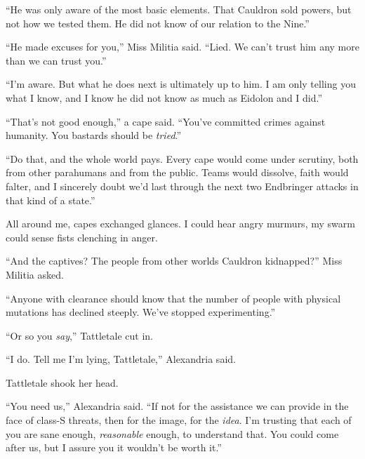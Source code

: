 ``He was only aware of the most basic elements.  That Cauldron sold powers, but not how we tested them.  He did not know of our relation to the Nine.''



``He made excuses for you,'' Miss Militia said.  ``Lied.  We can't trust him any more than we can trust you.''



``I'm aware.  But what he does next is ultimately up to him.  I am only telling you what I know, and I know he did not know as much as Eidolon and I did.''



``That's not good enough,'' a cape said.  ``You've committed crimes against humanity.  You bastards should be \emph{tried}.''



``Do that, and the whole world pays.  Every cape would come under scrutiny, both from other parahumans and from the public.  Teams would dissolve, faith would falter, and I sincerely doubt we'd last through the next two Endbringer attacks in that kind of a state.''



All around me, capes exchanged glances.  I could hear angry murmurs, my swarm could sense fists clenching in anger.



``And the captives?  The people from other worlds Cauldron kidnapped?''  Miss Militia asked.



``Anyone with clearance should know that the number of people with physical mutations has declined steeply.  We've stopped experimenting.''



``Or so you \emph{say},'' Tattletale cut in.



``I do.  Tell me I'm lying, Tattletale,'' Alexandria said.



Tattletale shook her head.



``You need us,'' Alexandria said.  ``If not for the assistance we can provide in the face of class-S threats, then for the image, for the \emph{idea}.  I'm trusting that each of you are sane enough, \emph{reasonable }enough, to understand that.  You could come after us, but I assure you it wouldn't be worth it.''



